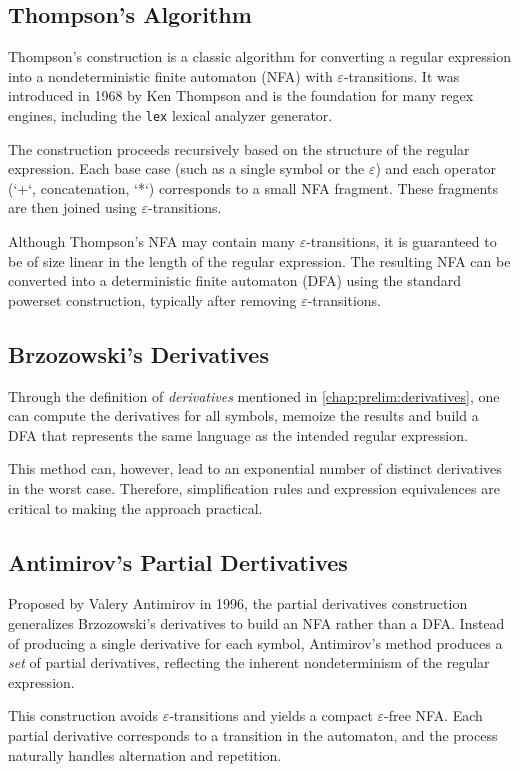 \subsection{Thompson's Algorithm}
Thompson's construction is a classic algorithm for converting a regular expression into a nondeterministic finite automaton (NFA) with $\varepsilon$-transitions. It was introduced in 1968 by Ken Thompson and is the foundation for many regex engines, including the \texttt{lex} lexical analyzer generator.

The construction proceeds recursively based on the structure of the regular expression. Each base case (such as a single symbol or the  $\varepsilon$) and each operator (`+`, concatenation, `*`) corresponds to a small NFA fragment. These fragments are then joined using $\varepsilon$-transitions.

Although Thompson's NFA may contain many $\varepsilon$-transitions, it is guaranteed to be of size linear in the length of the regular expression. The resulting NFA can be converted into a deterministic finite automaton (DFA) using the standard powerset construction, typically after removing $\varepsilon$-transitions.

\subsection{Brzozowski's Derivatives}
Through the definition of \emph{derivatives} mentioned in \ref{chap:prelim:derivatives}, one can compute the derivatives for all symbols, memoize the results and build a DFA that represents the same language as the intended regular expression.

This method can, however, lead to an exponential number of distinct derivatives in the worst case. Therefore, simplification rules and expression equivalences are critical to making the approach practical.

\subsection{Antimirov's Partial Dertivatives}
Proposed by Valery Antimirov in 1996, the partial derivatives construction generalizes Brzozowski's derivatives to build an NFA rather than a DFA. Instead of producing a single derivative for each symbol, Antimirov's method produces a \emph{set} of partial derivatives, reflecting the inherent nondeterminism of the regular expression.

This construction avoids $\varepsilon$-transitions and yields a compact $\varepsilon$-free NFA. Each partial derivative corresponds to a transition in the automaton, and the process naturally handles alternation and repetition.

